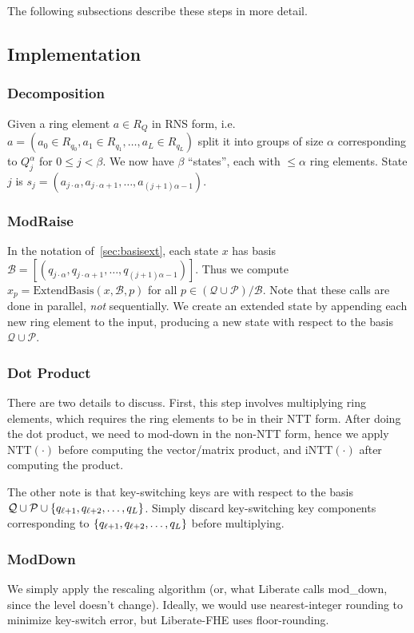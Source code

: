 \documentclass[../keyswitching.tex]{subfiles}
\begin{document}
The following subsections describe these steps in more detail.

\subsection{Implementation}
\subsubsection{Decomposition}
Given a ring element $a \in R_{Q}$ in RNS form, i.e. $a = (a_0\in R_{q_0}, a_1\in R_{q_1}, \ldots, a_{L}\in R_{q_L})$ split it into groups of size $\alpha$ corresponding to $Q_j^\alpha$ for $0\le j< \beta$. We now have $\beta$ ``states'', each with $\le\alpha$ ring elements. State $j$ is $s_j=(a_{j\cdot\alpha}, a_{j\cdot\alpha + 1}, \ldots, a_{(j+1)\alpha-1})$.

\subsubsection{ModRaise}
In the notation of~\cref{sec:basisext}, each state $x$ has basis $\mathcal{B}=[(q_{j\cdot\alpha}, q_{j\cdot\alpha + 1}, \ldots, q_{(j+1)\alpha-1})]$. Thus we compute $x_p = \mathrm{ExtendBasis}(x, \mathcal{B}, p)$ for all $p \in (\mathcal{Q}\cup\mathcal{P}) / \mathcal{B}$. Note that these calls are done in parallel, \emph{not} sequentially. We create an extended state by appending each new ring element to the input, producing a new state with respect to the basis $\mathcal{Q}\cup\mathcal{P}$.

\subsubsection{Dot Product}
There are two details to discuss. First, this step involves multiplying ring elements, which requires the ring elements to be in their NTT form. After doing the dot product, we need to mod-down in the non-NTT form, hence we apply $\mathrm{NTT}(\cdot)$ before computing the vector/matrix product, and $\mathrm{iNTT}(\cdot)$ after computing the product.

The other note is that key-switching keys are with respect to the basis $\mathcal{Q}\cup\mathcal{P}\cup\{q_{\ell+1}, q_{\ell+2}, \ldots, q_L\}$. Simply discard key-switching key components corresponding to $\{q_{\ell+1}, q_{\ell+2}, \ldots, q_L\}$ before multiplying. 

\subsubsection{ModDown}
We simply apply the rescaling algorithm (or, what Liberate calls \textsf{mod\_down}, since the level doesn't change). Ideally, we would use nearest-integer rounding to minimize key-switch error, but Liberate-FHE uses floor-rounding.
\end{document}
